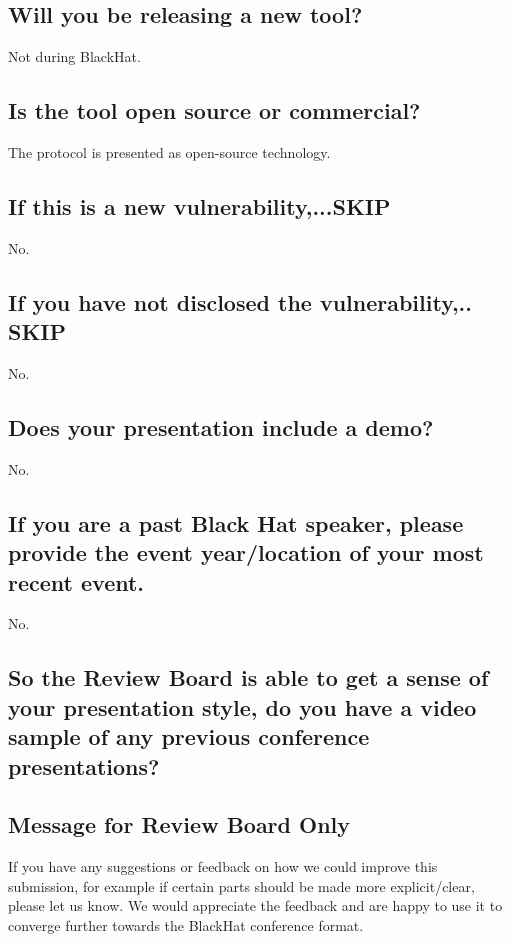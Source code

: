 \documentclass{article}
\begin{document}
\subsection{Will you be releasing a new tool?}
Not during BlackHat.
\subsection{Is the tool open source or commercial?}
The protocol is presented as open-source technology.
\subsection{If this is a new vulnerability,...SKIP}
No.
\subsection{If you have not disclosed the vulnerability,.. SKIP}
No.
\subsection{Does your presentation include a demo?}
No.
\subsection{If you are a past Black Hat speaker, please provide the event year/location of your most recent event.}
No.
\subsection{ So the Review Board is able to get a sense of your presentation style, do you have a video sample of any previous conference presentations?}
\subsection{Message for Review Board Only}
If you have any suggestions or feedback on how we could improve this submission, for example if certain parts should be made more explicit/clear, please let us know. We would appreciate the feedback and are happy to use it to converge further towards the BlackHat conference format.
\end{document}
